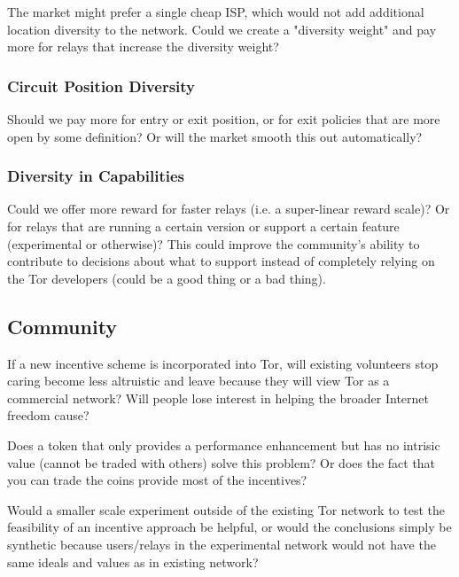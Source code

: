 The market might prefer a single cheap ISP, which would not add additional location diversity to the network. Could we create a "diversity weight" and pay more for relays that increase the diversity weight?

\subsubsection{Circuit Position Diversity}

Should we pay more for entry or exit position, or for exit policies that are more open by some definition? Or will the market smooth this out automatically?

\subsubsection{Diversity in Capabilities}

Could we offer more reward for faster relays (i.e. a super-linear reward scale)?  Or for relays that are running a certain version or support a certain feature (experimental or otherwise)? This could improve the community's ability to contribute to decisions about what to support instead of completely relying on the Tor developers (could be a good thing or a bad thing).

\subsection{Community}

If a new incentive scheme is incorporated into Tor, will existing volunteers stop caring become less altruistic and leave because they will view Tor as a commercial network? Will people lose interest in helping the broader Internet freedom cause?

Does a token that only provides a performance enhancement but has no intrisic value (cannot be traded with others) solve this problem? Or does the fact that you can trade the coins provide most of the incentives?

Would a smaller scale experiment outside of the existing Tor network to test the feasibility of an incentive approach be helpful, or would the conclusions simply be synthetic because users/relays in the experimental network would not have the same ideals and values as in existing network?